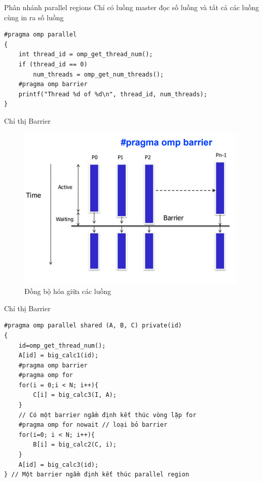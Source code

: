 \documentclass[10pt]{beamer}
\theoremstyle{remark}
\numberwithin{algocf}{section}
\numberwithin{equation}{section}
\numberwithin{dl}{section}
\numberwithin{figure}{section}
\begin{document}
\begin{frame}[fragile]{Phân nhánh parallel regions}
    Chỉ có luồng master đọc số luồng và tất cả các luồng cùng in ra số luồng
    \begin{verbatim}
#pragma omp parallel
{
    int thread_id = omp_get_thread_num();
    if (thread_id == 0)
        num_threads = omp_get_num_threads();
    #pragma omp barrier
    printf("Thread %d of %d\n", thread_id, num_threads); 
}
    \end{verbatim}
\end{frame}

\begin{frame}{Chỉ thị Barrier}
    \begin{figure}[H]
        \centering
        \includegraphics[width=0.9\linewidth]{figures/OpenMP/Barrier.png}
        \caption{Đồng bộ hóa giữa các luồng}
    \end{figure}
\end{frame}

\begin{frame}[fragile]{Chỉ thị Barrier}
    \begin{verbatim}
#pragma omp parallel shared (A, B, C) private(id)
{
    id=omp_get_thread_num();
    A[id] = big_calc1(id);
    #pragma omp barrier
    #pragma omp for
    for(i = 0;i < N; i++){
        C[i] = big_calc3(I, A);
    }
    // Có một barrier ngầm định kết thúc vòng lặp for
    #pragma omp for nowait // loại bỏ barrier
    for(i=0; i < N; i++){ 
        B[i] = big_calc2(C, i); 
    }
    A[id] = big_calc3(id);
} // Một barrier ngầm định kết thúc parallel region
    \end{verbatim}
\end{frame}
\end{document}
